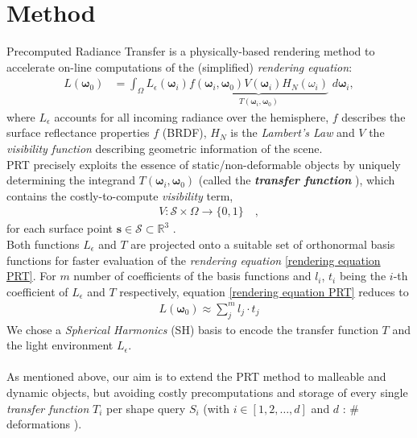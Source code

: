 \section{Method}
Precomputed Radiance Transfer  is a physically-based rendering method to accelerate on-line computations of the (simplified) \textit{rendering equation}:
\begin{align}
L(\bm{\omega}_0 ) &= 
\int_{\Omega}   L_{\epsilon}(\bm{\omega}_i ) 
\underbrace{f(\bm{\omega}_i,\bm{\omega}_0) 
V(\bm{\omega}_i) H_N(\omega_i) }_{T(\bm{\omega}_i,\bm{\omega}_0) }
\,  \, d\bm{\omega}_i , 
\label{rendering equation PRT}
\end{align}
where $L_{\epsilon}$ accounts for all incoming radiance over the hemisphere, $f$  describes the surface reflectance properties $f$ (BRDF), $H_N$ is the \textit{Lambert's Law} and $V$ the \textit{visibility function} describing geometric information of the scene.\\
PRT precisely exploits the essence of static/non-deformable objects by uniquely determining the integrand $T(\bm{\omega}_i,\bm{\omega}_0)$ (called the \textbf{\textit{transfer function}} ), which contains the costly-to-compute  \textit{visibility} term,
\begin{align*}
V :  \mathcal{S}  \times \Omega \rightarrow \{0,1\} \quad,
\end{align*}
for each surface point $\bm{s} \in \mathcal{S} \subset \mathbb{R}^3$ \cite{CohenBook}. 
\\
Both functions $L_{\epsilon} $ and $T$  are projected onto a suitable set of orthonormal basis functions for faster evaluation of the \textit{rendering equation} \ref{rendering equation PRT}. 
For $m$ number of coefficients of the basis functions and $l_i$, $t_i$ being the $i$-th coefficient of $L_{\epsilon} $ and $T$ respectively, equation \ref{rendering equation PRT} reduces to \cite{sloan2002precomputed} 
\begin{align}
L(\bm{\omega}_0 ) \approx \sum_{j}^{m} l_j \cdot t_j 
\label{Eq: Reduced Rendering Eq}
\end{align}
We chose a \textit{Spherical Harmonics} (SH) basis to encode the transfer function $T$ and the light environment $L_{\epsilon}$.
\\
\\
As mentioned above, our aim is to extend the PRT method to malleable and dynamic objects, but avoiding costly precomputations and storage of every single \textit{transfer function} $T_i$ per shape query $S_i$ (with $i \in [1,2,\dots, d]$ and $d$ : $\#$ deformations ). \\

